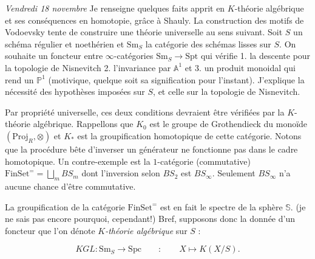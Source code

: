 \documentclass[11.8pt]{amsart}
\theoremstyle{plain}
\theoremstyle{definition}
\theoremstyle{remark}
\begin{document}
\textsl{Vendredi 18 novembre} \quad Je renseigne quelques faits apprit en $K$-théorie algébrique et ses conséquences en homotopie, grâce à Shauly. La construction des motifs de Vodoevsky tente de construire une théorie \og universelle \fg au sens suivant. Soit $S$ un schéma régulier et noethérien et $\mathrm{Sm}_S$ la catégorie des schémas lisses sur $S$. On souhaite un foncteur entre $\infty$-catégories $ \mathrm{Sm}_S\to \mathrm{Spt}$ qui vérifie 1. la descente pour la topologie de Nisnevitch 2. l'invariance par $\mathbb A^1$ et 3. un produit monoidal qui rend un $\mathbb P^1$ (motivique, quelque soit sa signification pour l'instant). J'explique la nécessité des hypothèses imposées sur $S$, et celle sur la topologie de Nisnevitch. 

Par propriété universelle, ces deux conditions devraient être vérifiées par la $K$-théorie algébrique. Rappellons que $K_0$ est le groupe de Grothendieck du monoïde $(\mathrm{Proj}_R, \otimes)$ et $K_*$ est la \og groupification homotopique \fg de cette catégorie. Notons que la procédure bête d'inverser un générateur ne fonctionne pas dans le cadre homotopique. Un contre-exemple est la $1$-catégorie (commutative) $\mathrm{FinSet}^= = \bigsqcup_m BS_m$ dont l'inversion selon $BS_2$ est $BS_\infty$. Seulement $BS_\infty$ n'a aucune chance d'être commutative. 

La groupification de la catégorie $\mathrm{FinSet}^=$ est en fait le spectre de la sphère $\mathbb S$. (je ne sais pas encore pourquoi, cependant!) Bref, supposons donc la donnée d'un foncteur que l'on dénote \textit{$K$-théorie algébrique} sur $S$ :

$$KGL : \mathrm{Sm}_S\to \mathrm{Spc} \qquad :\qquad X \longmapsto K(X/S).$$
\end{document}
